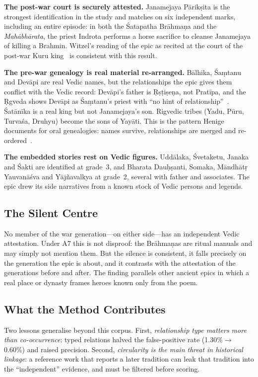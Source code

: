 \documentclass[journal]{IEEEtran}
\newcommand{\MBh}{\textit{Mahābhārata}}
\begin{document}
\textbf{The post-war court is securely attested.} Janamejaya Pārikṣita is the strongest identification in the study and
matches on six independent marks, including an entire episode: in both the Śatapatha Brāhmaṇa and the \MBh{}, the priest
Indrota performs a horse sacrifice to cleanse Janamejaya of killing a Brahmin. Witzel's reading of the epic as recited
at the court of the post-war Kuru king~\cite{witzel1995} is consistent with this result.

\textbf{The pre-war genealogy is real material re-arranged.} Bālhika, Śaṃtanu and Devāpi are real Vedic names, but the
relationships the epic gives them conflict with the Vedic record: Devāpi's father is Ṛṣṭiṣeṇa, not Pratīpa, and the
Ṛgveda shows Devāpi as Śaṃtanu's priest with ``no hint of relationship''~\cite{macdonell1912}. Śatānīka is a real king
but not Janamejaya's son. Rigvedic tribes (Yadu, Pūru, Turvaśa, Druhyu) become the sons of Yayāti. This is the pattern
Henige documents for oral genealogies: names survive, relationships are merged and re-ordered~\cite{henige1974}.

\textbf{The embedded stories rest on Vedic figures.} Uddālaka, Śvetaketu, Janaka and Śakti are identified at grade~3, and Bharata Dauḥṣanti, Somaka, Māndhātṛ Yauvanāśva and
Yājñavalkya at grade~2, several with father and associates. The epic drew its side
narratives from a known stock of Vedic persons and legends.

\subsection{The Silent Centre}
No member of the war generation---on either side---has an independent Vedic attestation. Under A7 this is not
disproof: the Brāhmaṇas are ritual manuals and may simply not mention them. But the silence is consistent, it falls
precisely on the generation the epic is about, and it contrasts with the attestation of the generations before and
after. The finding parallels other ancient epics in which a real place or dynasty frames heroes known only from the
poem.

\subsection{What the Method Contributes}
Two lessons generalise beyond this corpus. First, \emph{relationship type matters more than co-occurrence}: typed
relations halved the false-positive rate (1.30\%$\rightarrow$0.60\%) and raised precision. Second, \emph{circularity
is the main threat in historical linkage}: a reference work that reports a later tradition can leak that tradition into
the ``independent'' evidence, and must be filtered before scoring.
\end{document}
